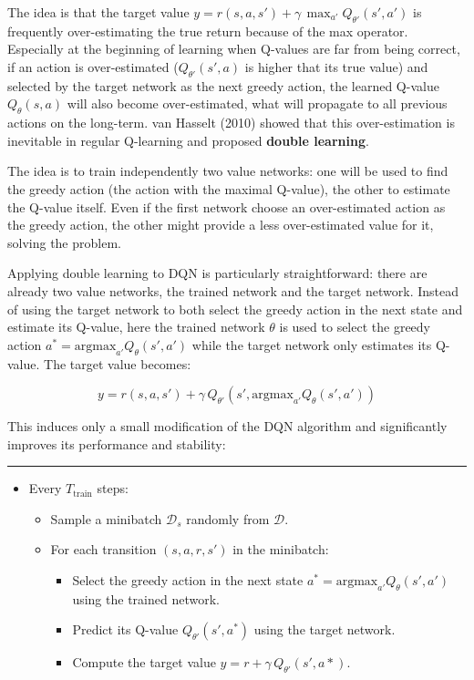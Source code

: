 \documentclass[
  letterpaper,
  DIV=11,
  numbers=noendperiod]{scrreprt}
\providecommand{\tightlist}{%
  \setlength{\itemsep}{0pt}\setlength{\parskip}{0pt}}\usepackage{longtable,booktabs,array}
\begin{document}
The idea is that the target value
\(y = r(s, a, s') + \gamma \, \max_{a'} Q_{\theta'}(s', a')\) is
frequently over-estimating the true return because of the max operator.
Especially at the beginning of learning when Q-values are far from being
correct, if an action is over-estimated (\(Q_{\theta'}(s', a)\) is
higher that its true value) and selected by the target network as the
next greedy action, the learned Q-value \(Q_{\theta}(s, a)\) will also
become over-estimated, what will propagate to all previous actions on
the long-term. van Hasselt (2010) showed that this over-estimation is
inevitable in regular Q-learning and proposed \textbf{double learning}.

The idea is to train independently two value networks: one will be used
to find the greedy action (the action with the maximal Q-value), the
other to estimate the Q-value itself. Even if the first network choose
an over-estimated action as the greedy action, the other might provide a
less over-estimated value for it, solving the problem.

Applying double learning to DQN is particularly straightforward: there
are already two value networks, the trained network and the target
network. Instead of using the target network to both select the greedy
action in the next state and estimate its Q-value, here the trained
network \(\theta\) is used to select the greedy action
\(a^* = \text{argmax}_{a'} Q_\theta (s', a')\) while the target network
only estimates its Q-value. The target value becomes:

\[
    y = r(s, a, s') + \gamma \, Q_{\theta'}(s', \text{argmax}_{a'} Q_\theta (s', a'))
\]

This induces only a small modification of the DQN algorithm and
significantly improves its performance and stability:

\begin{center}\rule{0.5\linewidth}{0.5pt}\end{center}

\begin{itemize}
\tightlist
\item
  Every \(T_\text{train}\) steps:

  \begin{itemize}
  \tightlist
  \item
    Sample a minibatch \(\mathcal{D}_s\) randomly from \(\mathcal{D}\).
  \item
    For each transition \((s, a, r, s')\) in the minibatch:

    \begin{itemize}
    \tightlist
    \item
      Select the greedy action in the next state
      \(a^* = \text{argmax}_{a'} Q_\theta (s', a')\) using the trained
      network.
    \item
      Predict its Q-value \(Q_{\theta'}(s', a^*)\) using the target
      network.
    \item
      Compute the target value
      \(y = r + \gamma \, Q_{\theta'}(s', a*)\).
    \end{itemize}
  \end{itemize}
\end{itemize}
\end{document}
